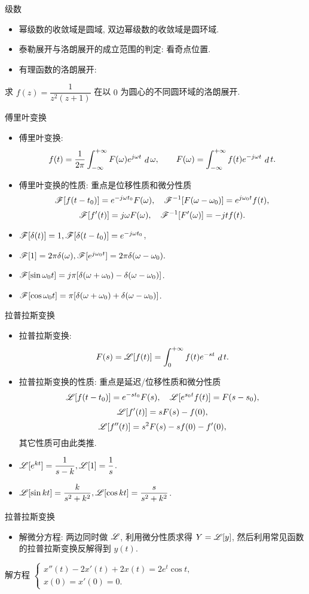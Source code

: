 \documentclass[12pt]{ctexbeamer}
\begin{document}
\begin{frame}{级数}
\begin{itemize}
\item 幂级数的收敛域是圆域, 双边幂级数的收敛域是圆环域.
\item 泰勒展开与洛朗展开的成立范围的判定: 看奇点位置.
\item 有理函数的洛朗展开:
\end{itemize}
\begin{exercise}
求 $f(z)=\dfrac{1}{z^2(z+1)}$ 在以 $0$ 为圆心的不同圆环域的洛朗展开.
\end{exercise}
\end{frame}


\begin{frame}{傅里叶变换}
\begin{itemize}
\item 傅里叶变换:
\[f(t)=\frac1{2\pi} \int_{-\infty}^{+\infty}F(\omega) e^{j\omega t} \,\mathop{d}\omega,\qquad  F(\omega)=\int_{-\infty}^{+\infty}f(t) e^{-j\omega t} \,\mathop{d} t.\]
\item 傅里叶变换的性质: 重点是位移性质和微分性质
\[\mathscr{F}[f(t-t_0)]=e^{-j\omega t_0}F(\omega),\quad
\mathscr{F}^{-1}[F(\omega-\omega_0)]=e^{j\omega_0 t}f(t),\]
\[\mathscr{F}[f'(t)]=j\omega F(\omega),\quad
\mathscr{F}^{-1}[F'(\omega)]=-jtf(t).\]
\item $\mathscr{F}[\delta(t)]=1,\mathscr{F}[\delta(t-t_0)]=e^{-j\omega t_0}$,
\item $\mathscr{F}[1]=2\pi \delta(\omega),\mathscr{F}[e^{j\omega_0 t}]=2\pi\delta(\omega-\omega_0).$
\item $\mathscr{F}[\sin{\omega_0 t}]=j\pi[\delta(\omega+\omega_0)-\delta(\omega-\omega_0)]$.
\item $\mathscr{F}[\cos{\omega_0 t}]=\pi[\delta(\omega+\omega_0)+\delta(\omega-\omega_0)]$.
\end{itemize}
\end{frame}


\begin{frame}{拉普拉斯变换}
\begin{itemize}
\item 拉普拉斯变换:
\[F(s)=\mathscr{L}[f(t)]=\displaystyle\int_0^{+\infty}f(t)e^{-st}\,\mathop{d} t.\]
\item 拉普拉斯变换的性质: 重点是延迟/位移性质和微分性质
\[\mathscr{L}[f(t-t_0)]=e^{-st_0}F(s),\quad
\mathscr{L}[e^{s_0t}f(t)]=F(s-s_0),\]
\[\mathscr{L}[f'(t)]=sF(s)-f(0),\]
\[\mathscr{L}[f''(t)]=s^2F(s)-sf(0)-f'(0),\]
其它性质可由此类推.
\item $\mathscr{L}[e^{kt}]=\dfrac1{s-k},\mathscr{L}[1]=\dfrac1s$.
\item $\mathscr{L}[\sin{kt}]=\dfrac k{s^2+k^2},\mathscr{L}[\cos{kt}]=\dfrac s{s^2+k^2}$.
\end{itemize}
\end{frame}


\begin{frame}{拉普拉斯变换}
\begin{itemize}
\item 解微分方程: 两边同时做 $\mathscr{L}$, 利用微分性质求得 $Y=\mathscr{L}[y]$, 然后利用常见函数的拉普拉斯变换反解得到 $y(t)$.
\end{itemize}
\begin{exercise}
解方程 
  $\begin{cases}
    x''(t)-2x'(t)+2x(t)=2e^t\cos t,&\\
    x(0)=x'(0)=0.&
  \end{cases}$
\end{exercise}
\end{frame}
\end{document}
